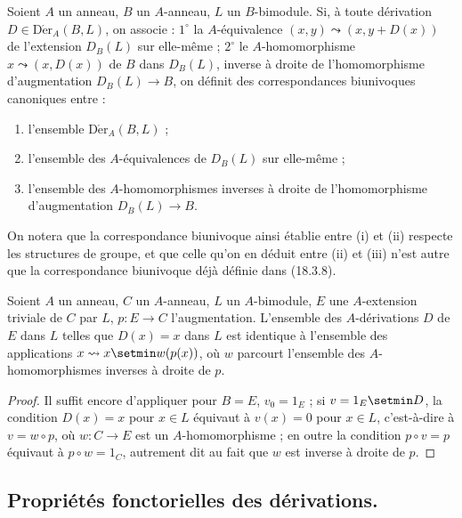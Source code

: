 \begin{corollary}[20.1.6]
\label{0.20.1.6-fr}
Soient $A$ un anneau, $B$ un $A$-anneau, $L$ un $B$-bimodule. Si, à toute
dérivation $D\in\operatorname{D\acute{e}r}_A(B,L)$, on associe : $1^\circ$ la
$A$-équivalence $(x,y)\leadsto(x,y+D(x))$ de l'extension $D_B(L)$ sur
elle-même ; $2^\circ$ le $A$-homomorphisme $x\leadsto(x,D(x))$ de $B$ dans
$D_B(L)$, inverse à droite de l'homomorphisme d'augmentation $D_B(L)\to B$,
on définit des correspondances biunivoques canoniques entre :
\begin{enumerate}
  \item[\rm(i)] l'ensemble $\operatorname{D\acute{e}r}_A(B,L)$ ;
  \item[\rm(ii)] l'ensemble des $A$-équivalences de $D_B(L)$ sur elle-même ;
  \item[\rm(iii)] l'ensemble des $A$-homomorphismes inverses à droite de
  l'homomorphisme d'augmentation $D_B(L)\to B$.
\end{enumerate}
\end{corollary}

On notera que la correspondance biunivoque ainsi établie entre (i) et (ii)
respecte les structures de groupe, et que celle qu'on en déduit entre (ii) et
(iii) n'est autre que la correspondance biunivoque déjà définie dans (18.3.8).

\begin{corollary}[20.1.7]
\label{0.20.1.7-fr}
Soient $A$ un anneau, $C$ un $A$-anneau, $L$ un $A$-bimodule, $E$ une
$A$-extension triviale de $C$ par $L$, $p:E\to C$ l'augmentation. L'ensemble
des $A$-dérivations $D$ de $E$ dans $L$ telles que $D(x)=x$ dans $L$ est
identique à l'ensemble des applications $x\leadsto x\setmin w(p(x))$, où $w$
parcourt l'ensemble des $A$-homomorphismes inverses à droite de $p$.
\end{corollary}

\begin{proof}
Il suffit encore d'appliquer  pour $B=E$,
$v_0=1_E$ ; si $v=1_E\setmin D$, la condition $D(x)=x$ pour
$x\in L$ équivaut à $v(x)=0$ pour $x\in L$, c'est-à-dire à $v=w\circ p$,
où $w:C\to E$ est un $A$-homomorphisme ; en outre la condition
$p\circ v=p$ équivaut à $p\circ w=1_C$, autrement dit au fait que
$w$ est inverse à droite de $p$.
\end{proof}

\subsection{Propriétés fonctorielles des dérivations.}
\label{subsection:0.20.2-fr}


